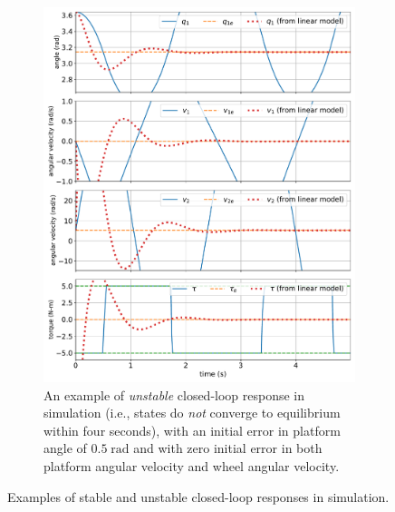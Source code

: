 \documentclass[conf]{new-aiaa}
\begin{document}
\begin{figure}[p]
\begin{subfigure}[t]{0.49\textwidth}
\includegraphics[width=\textwidth]{fig02}
\caption{An example of {\em unstable} closed-loop response in simulation (i.e., states do {\em not} converge to equilibrium within four seconds), with an initial error in platform angle of $0.5\;\text{rad}$ and with zero initial error in both platform angular velocity and wheel angular velocity.}
\label{fig-unstable}
\end{subfigure}
\caption{Examples of stable and unstable closed-loop responses in simulation.}
\label{fig-examples}
\end{figure}

\end{document}
